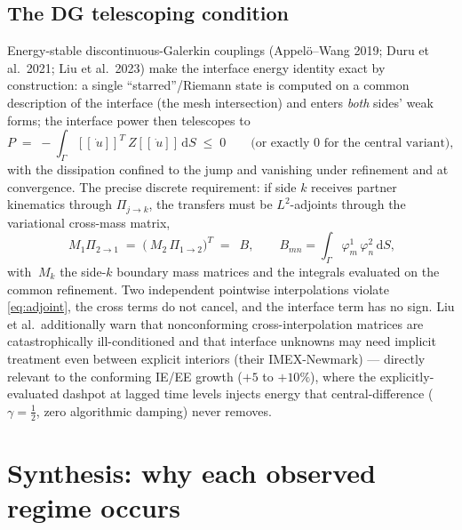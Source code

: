 \documentclass[11pt]{article}
\newcommand{\dd}{\mathrm{d}}
\newcommand{\jump}[1]{[\![#1]\!]}
\begin{document}
\subsection{The DG telescoping condition}

Energy-stable discontinuous-Galerkin couplings (Appel\"o--Wang 2019;
Duru et al.\ 2021; Liu et al.\ 2023) make the interface energy identity exact
by construction: a single ``starred''/Riemann state is computed on a common
description of the interface (the mesh intersection) and enters \emph{both}
sides' weak forms; the interface power then telescopes to
\begin{equation}
  P \;=\; -\int_\Gamma \jump{\dot{~u}}^T ~Z \jump{\dot{~u}} \,\dd S
  \;\le\; 0
  \qquad\text{(or exactly } 0 \text{ for the central variant)},
  \label{eq:telescope}
\end{equation}
with the dissipation confined to the jump and vanishing under refinement and
at convergence. The precise discrete requirement: if side $k$ receives partner
kinematics through $\Pi_{j\to k}$, the transfers must be $L^2$-adjoints
through the variational cross-mass matrix,
\begin{equation}
  ~M_1 \Pi_{2\to1} \;=\; \bigl(~M_2\,\Pi_{1\to2}\bigr)^{T} \;=\; ~B,
  \qquad
  B_{mn} = \int_\Gamma \varphi^1_m\,\varphi^2_n \,\dd S,
  \label{eq:adjoint}
\end{equation}
with $~M_k$ the side-$k$ boundary mass matrices and the integrals evaluated on
the common refinement. Two independent pointwise interpolations violate
\eqref{eq:adjoint}, the cross terms do not cancel, and the interface term has
no sign. Liu et al.\ additionally warn that nonconforming cross-interpolation
matrices are catastrophically ill-conditioned and that interface unknowns may
need implicit treatment even between explicit interiors (their IMEX-Newmark)
--- directly relevant to the conforming IE/EE growth ($+5$ to $+10\%$), where
the explicitly-evaluated dashpot at lagged time levels injects energy that
central-difference ($\gamma = \tfrac12$, zero algorithmic damping) never
removes.

\section{Synthesis: why each observed regime occurs}
\label{sec:synthesis}
\end{document}
